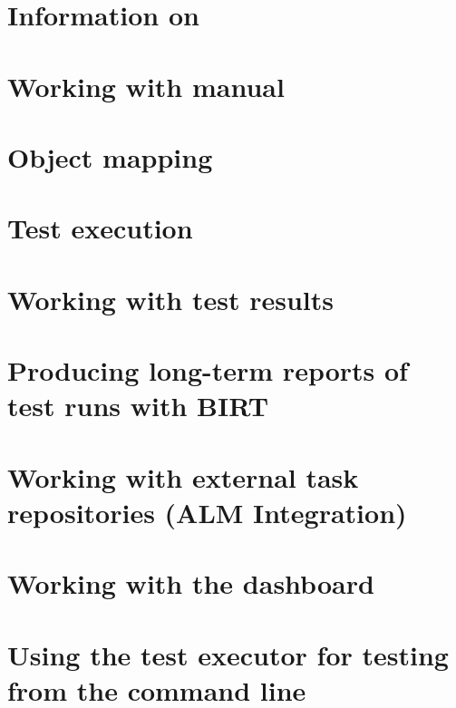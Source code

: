 \clearpage 

\section{Information on \gdsteps{}}


\section{Working with manual \gdcases{}}


\clearpage

\section{Object mapping}


\clearpage

\section{Test execution}
\label{TestExec}


\clearpage

\section{Working with test results}


\clearpage
\section{Producing long-term reports of test runs with BIRT}
\label{TasksBIRT}

\clearpage
\section{Working with external task repositories (ALM Integration)}
\label{TasksALM}

\clearpage
\section{Working with the dashboard}
\label{TasksDashboard}

\clearpage
\section{Using the test executor for testing from the command line}

\clearpage
